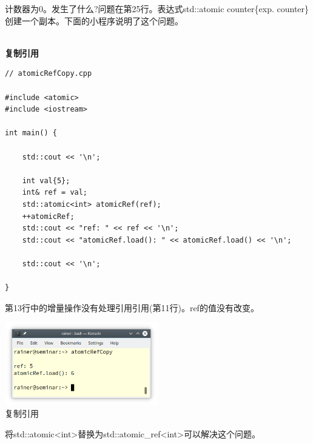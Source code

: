 计数器为0。发生了什么?问题在第25行。表达式std::atomic counter\{exp. counter\}创建一个副本。下面的小程序说明了这个问题。

\hspace*{\fill} \\ %
\noindent
\textbf{复制引用}
\begin{lstlisting}[style=styleCXX]
// atomicRefCopy.cpp

#include <atomic>
#include <iostream>

int main() {

	std::cout << '\n';
	
	int val{5};
	int& ref = val;
	std::atomic<int> atomicRef(ref);
	++atomicRef;
	std::cout << "ref: " << ref << '\n';
	std::cout << "atomicRef.load(): " << atomicRef.load() << '\n';
	
	std::cout << '\n';

}
\end{lstlisting}

第13行中的增量操作没有处理引用引用(第11行)。ref的值没有改变。

\begin{center}
\includegraphics[width=0.5\textwidth]{content/3/chapter6/images/9.png}\\
复制引用
\end{center}

将std::atomic<int>替换为std::atomic\_ref<int>可以解决这个问题。

